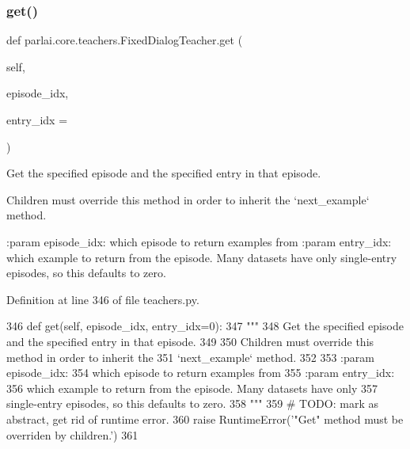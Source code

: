 \subsubsection{\texorpdfstring{get()}{get()}}
{\footnotesize\ttfamily def parlai.\+core.\+teachers.\+Fixed\+Dialog\+Teacher.\+get (\begin{DoxyParamCaption}\item[{}]{self,  }\item[{}]{episode\+\_\+idx,  }\item[{}]{entry\+\_\+idx = {} }\end{DoxyParamCaption})}

\begin{DoxyVerb}Get the specified episode and the specified entry in that episode.

Children must override this method in order to inherit the
`next_example` method.

:param episode_idx:
    which episode to return examples from
:param entry_idx:
    which example to return from the episode.  Many datasets have only
    single-entry episodes, so this defaults to zero.
\end{DoxyVerb}
 

Definition at line 346 of file teachers.\+py.


\begin{DoxyCode}
346     \textcolor{keyword}{def }get(self, episode\_idx, entry\_idx=0):
347         \textcolor{stringliteral}{"""}
348 \textcolor{stringliteral}{        Get the specified episode and the specified entry in that episode.}
349 \textcolor{stringliteral}{}
350 \textcolor{stringliteral}{        Children must override this method in order to inherit the}
351 \textcolor{stringliteral}{        `next\_example` method.}
352 \textcolor{stringliteral}{}
353 \textcolor{stringliteral}{        :param episode\_idx:}
354 \textcolor{stringliteral}{            which episode to return examples from}
355 \textcolor{stringliteral}{        :param entry\_idx:}
356 \textcolor{stringliteral}{            which example to return from the episode.  Many datasets have only}
357 \textcolor{stringliteral}{            single-entry episodes, so this defaults to zero.}
358 \textcolor{stringliteral}{        """}
359         \textcolor{comment}{# TODO: mark as abstract, get rid of runtime error.}
360         \textcolor{keywordflow}{raise} RuntimeError(\textcolor{stringliteral}{'"Get" method must be overriden by children.'})
361 
\end{DoxyCode}
\mbox{\label{classparlai_1_1core_1_1teachers_1_1FixedDialogTeacher_a49100faf9af79c6e24ddac9e36151d54}} 
